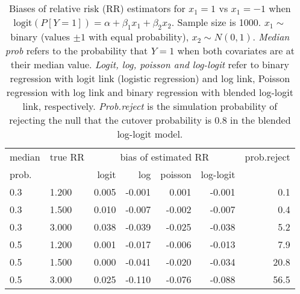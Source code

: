 \documentclass[12pt,a4paper]{article}
\begin{document}
\begin{table}[H] 
\small\sf\centering 
\caption{Biases of relative risk (RR) estimators for $x_1=1$ vs $x_1=-1$ when $\mbox{logit}(P[Y=1])=\alpha+\beta_1 x_1 + \beta_2 x_2$. Sample size is 1000. $x_1 \sim $binary (values $\pm 1$ with equal probability), $x_2 \sim N(0,1)$. {\it Median prob} refers to the probability that $Y=1$ when both covariates are at their median value. {\it Logit, log, poisson and log-logit} refer to binary regression with logit link (logistic regression) and log link, Poisson regression with log link and binary regression with blended log-logit link, respectively. {\it Prob.reject} is the simulation probability of rejecting the null that the cutover probability is $0.8$ in the blended log-logit model.} 
\begin{tabular}{llrrrrr} 
\toprule 
median & true RR & \multicolumn{4}{c}{bias of estimated RR} & prob.reject \\ 
prob. & & logit & log & poisson & log-logit  & \\ \midrule 
0.3 & 1.200 & 0.005 & -0.001 &  0.001 & -0.001 &  0.1 \\  
0.3 & 1.500 & 0.010 & -0.007 & -0.002 & -0.007 &  0.4 \\  
0.3 & 3.000 & 0.038 & -0.039 & -0.025 & -0.038 &  5.2 \\  
0.5 & 1.200 & 0.001 & -0.017 & -0.006 & -0.013 &  7.9 \\  
0.5 & 1.500 & 0.000 & -0.041 & -0.020 & -0.034 & 20.8 \\  
0.5 & 3.000 & 0.025 & -0.110 & -0.076 & -0.088 & 56.5 \\  
\bottomrule 
\end{tabular} 
\end{table} 
\end{document}
